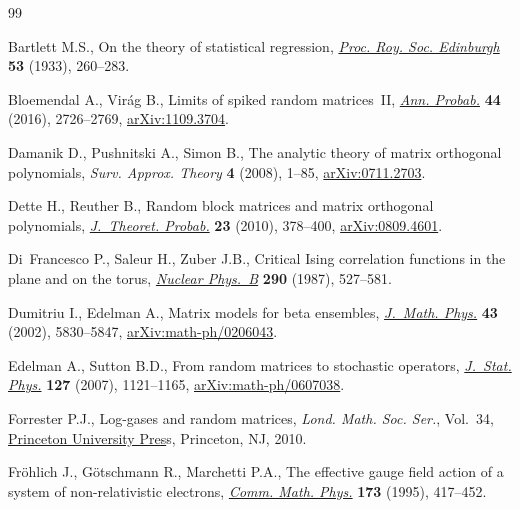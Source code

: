 \documentclass[pdftex]{sigma}
\numberwithin{equation}{section}
\theoremstyle{definition}
\begin{document}
\begin{thebibliography}{99}
\footnotesize\itemsep=0pt

Bartlett M.S., On the theory of statistical regression,
 \href{https://doi.org/10.1017/S0370164600015637}{\textit{Proc. Roy. Soc.
 Edinburgh}} \textbf{53} (1933), 260--283.

Bloemendal A., Vir\'ag B., Limits of spiked random matrices~{II},
 \href{https://doi.org/10.1214/15-AOP1033}{\textit{Ann. Probab.}} \textbf{44}
 (2016), 2726--2769, \href{http://arxiv.org/abs/1109.3704}{arXiv:1109.3704}.

Damanik D., Pushnitski A., Simon B., The analytic theory of matrix orthogonal
 polynomials, \textit{Surv.
 Approx. Theory} \textbf{4} (2008), 1--85,
 \href{http://arxiv.org/abs/0711.2703}{arXiv:0711.2703}.

Dette H., Reuther B., Random block matrices and matrix orthogonal polynomials,
 \href{https://doi.org/10.1007/s10959-008-0189-z}{\textit{J.~Theoret.
 Probab.}} \textbf{23} (2010), 378--400,
 \href{http://arxiv.org/abs/0809.4601}{arXiv:0809.4601}.

Di~Francesco P., Saleur H., Zuber J.B., Critical {I}sing correlation functions
 in the plane and on the torus,
 \href{https://doi.org/10.1016/0550-3213(87)90202-1}{\textit{Nuclear Phys.~B}}
 \textbf{290} (1987), 527--581.

Dumitriu I., Edelman A., Matrix models for beta ensembles,
 \href{https://doi.org/10.1063/1.1507823}{\textit{J.~Math. Phys.}} \textbf{43}
 (2002), 5830--5847,
 \href{http://arxiv.org/abs/math-ph/0206043}{arXiv:math-ph/0206043}.

Edelman A., Sutton B.D., From random matrices to stochastic operators,
 \href{https://doi.org/10.1007/s10955-006-9226-4}{\textit{J.~Stat. Phys.}}
 \textbf{127} (2007), 1121--1165,
 \href{http://arxiv.org/abs/math-ph/0607038}{arXiv:math-ph/0607038}.

Forrester P.J., Log-gases and random matrices, \textit{Lond. Math. Soc. Ser.},
 Vol.~34, \href{https://doi.org/10.1515/9781400835416}{Princeton University
 Pres}s, Princeton, NJ, 2010.

Fr\"ohlich J., G\"otschmann R., Marchetti P.A., The effective gauge field
 action of a system of non-relativistic electrons,
 \href{https://doi.org/10.1007/BF02101241}{\textit{Comm. Math. Phys.}}
 \textbf{173} (1995), 417--452.


\end{thebibliography}
\end{document}
